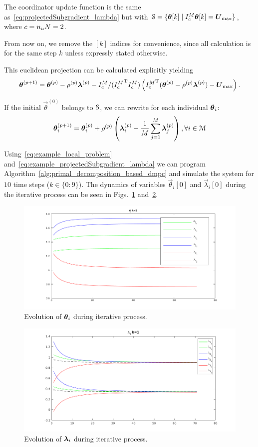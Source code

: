 \documentclass[../main.tex]{subfiles}
\begin{document}
The coordinator update function is the same as~\eqref{eq:projectedSubgradient_lambda} but with ${\mathcal{S} = \{\boldsymbol{\theta}[k]\mid I_{c}^{M}\boldsymbol{\theta}[k] = \boldsymbol{U}_{\max}\}}$, where $c=n_{u}N=2$.

From now on, we remove the $[k]$ indices for convenience, since all calculation is for the same step $k$ unless expressly stated otherwise.

This euclidean projection can be calculated explicitly yielding
\begin{equation}
    \boldsymbol{\theta}^{(p+1)}=\boldsymbol{\theta}^{(p)}-\rho^{(p)}\boldsymbol{\lambda}^{(p)}-{I_{c}^M}/({I_{c}^M}^{\mathrm{T}} {I_{c}^M})\left({I_{c}^M}^{\mathrm{T}}(\boldsymbol{\theta}^{(p)}-\rho^{(p)}\boldsymbol{\lambda}^{(p)}) -\boldsymbol{U}_{\max}\right).
\end{equation}

If the initial ${\vec{\theta}}^{(0)}$ belongs to $\mathcal{S}$, we can rewrite for each individual $\boldsymbol{\theta}_i$:
\begin{equation}
  \label{eq:example_projectedSubgradient_lambda}
 \boldsymbol{\theta}_i^{(p+1)}=\boldsymbol{\theta}_i^{(p)}+\rho^{(p)}\left(\boldsymbol{\lambda}_i^{(p)}-\frac{1}{M}\sum_{j=1}^{M}\boldsymbol{\lambda}_j^{(p)}\right),\forall i\in\mathcal{M}
\end{equation}

Using~\eqref{eq:example_local_problem} and~\eqref{eq:example_projectedSubgradient_lambda}
we can program Algorithm~\ref{alg:primal_decomposition_based_dmpc} and simulate the system for $10$ time steps (${k\in\{0\mathbin{:}9\}}$).
The dynamics of variables $\vec{\theta}_{i}[0]$ and $\vec{\lambda}_{i}[0]$ during the iterative process can be seen in Figs.~\ref{fig:example_theta} and~\ref{fig:example_lambda}.

\begin{figure}[h]
  \centering
  \includegraphics[width=.5\textwidth]{../img/example_theta.png}
  \caption{Evolution of $\boldsymbol{\theta}_i$ during iterative process. }\label{fig:example_theta}
\end{figure}

\begin{figure}[h]
  \centering
  \includegraphics[width=.5\textwidth]{../img/example_lambda.png}
  \caption{Evolution of $\boldsymbol{\lambda}_i$ during iterative process. }\label{fig:example_lambda}
\end{figure}
\end{document}
